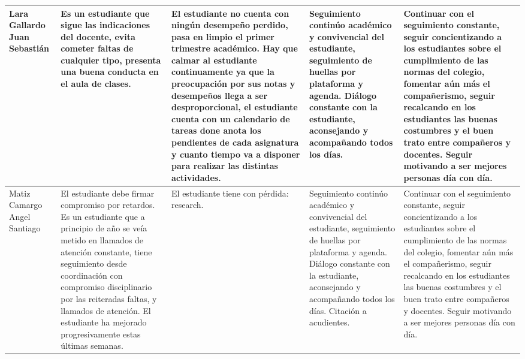 \documentclass[spanish,11pt,a4paper]{article}
\begin{document}
\begin{longtable}{|p{3.5cm}|p{3.5cm}|p{3.5cm}|p{3.5cm}|p{3.5cm}|}
		Lara Gallardo Juan Sebastián & 
		Es un estudiante que sigue las indicaciones del docente, evita cometer faltas de cualquier tipo, presenta una buena conducta en el aula de clases. & 
		El estudiante no cuenta con ningún desempeño perdido, pasa en limpio el primer trimestre académico. Hay que calmar al estudiante continuamente ya que la preocupación por sus notas y desempeños llega a ser desproporcional, el estudiante cuenta con un calendario de tareas done anota los pendientes de cada asignatura y cuanto tiempo va a disponer para realizar las distintas actividades. & 
		Seguimiento continúo académico y convivencial del estudiante, seguimiento de huellas por plataforma y agenda. Diálogo constante con la estudiante, aconsejando y acompañando todos los días. & 
		Continuar con el seguimiento constante, seguir concientizando a los estudiantes sobre el cumplimiento de las normas del colegio, fomentar aún más el compañerismo, seguir recalcando en los estudiantes las buenas costumbres y el buen trato entre compañeros y docentes. Seguir motivando a ser mejores personas día con día.\\
		\hline
		
		Matiz Camargo Angel Santiago & 
		El estudiante debe firmar compromiso por retardos.
		Es un estudiante que a principio de año se veía metido en llamados de atención constante, tiene seguimiento desde coordinación con compromiso disciplinario por las reiteradas faltas, y llamados de atención. El estudiante ha mejorado progresivamente estas últimas semanas.  
		& 
		El estudiante tiene con pérdida: research. & 
		Seguimiento continúo académico y convivencial del estudiante, seguimiento de huellas por plataforma y agenda. Diálogo constante con la estudiante, aconsejando y acompañando todos los días. Citación a acudientes.& 
		Continuar con el seguimiento constante, seguir concientizando a los estudiantes sobre el cumplimiento de las normas del colegio, fomentar aún más el compañerismo, seguir recalcando en los estudiantes las buenas costumbres y el buen trato entre compañeros y docentes. Seguir motivando a ser mejores personas día con día.\\
		\hline
		

\end{longtable}
\end{document}
